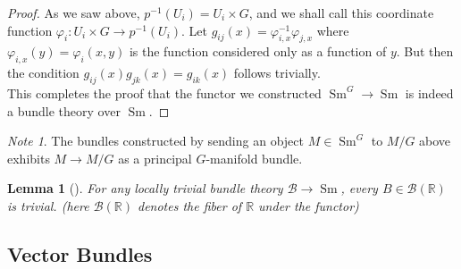 \documentclass[reqno]{amsart}
\newtheorem{lemma}[theorem]{Lemma}
\theoremstyle{definition}
\theoremstyle{remark}
\newtheorem*{note}{Note}
\DeclareMathOperator{\Sm}{Sm}
\begin{document}
\begin{proof}
        As we saw above,
        $p^{-1}\left( U_i \right) 
        = U_i \times G $, and we shall call this
        coordinate function $\varphi_i \colon
        U_i \times G \to p^{-1}(U_i)$.
        Let $g_{ij} (x) = 
        \varphi_{i,x}^{-1} \varphi_{j,x}$ where
        $\varphi_{i,x}(y) = \varphi_{i}(x,y)$ is the function
        considered only as a function of $y$. But then
        the condition
        $g_{ij}(x)  g_{jk}(x) = g_{ik}(x)$ follows
        trivially.\\
        \linebreak
        This completes the proof that the functor
        we constructed $\Sm^{G}\to \Sm$ is indeed
        a bundle theory over $\Sm$. 
    \end{proof}
        

        \begin{note}
            The bundles constructed by sending
            an object $M \in \Sm^{G}$ to $M /G$ 
            above exhibits $M \to M /G$ as a principal
            $G$-manifold bundle.
        \end{note}

        \begin{lemma}[]
            For any locally trivial bundle theory
            $\mathcal{B} \to \Sm$, 
            every $B \in \mathcal{B}(\mathbb{R})$ is trivial.
            (here $\mathcal{B}(\mathbb{R})$ denotes the
            fiber of $\mathbb{R}$ under the functor)
        \end{lemma}

    \newpage

    \subsection{Vector Bundles}
\end{document}
